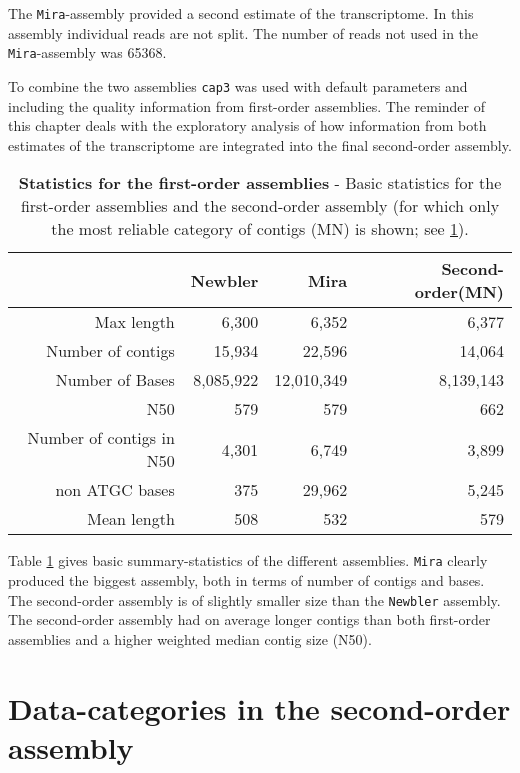The \texttt{Mira}-assembly provided a second estimate of the
transcriptome. In this assembly individual reads are not split. The
number of reads not used in the \texttt{Mira}-assembly was 65368.

To combine the two assemblies \texttt{cap3} was used with default
parameters and including the quality information from first-order
assemblies. The reminder of this chapter deals with the exploratory
analysis of how information from both estimates of the transcriptome
are integrated into the final second-order assembly.

\begin{table}[ht]
\begin{center}
\begin{tabular}{rrrr}
  \hline
 & Newbler & Mira & Second-order(MN) \\ 
  \hline
Max length & 6,300 & 6,352 & 6,377 \\ 
  Number of contigs & 15,934 & 22,596 & 14,064 \\ 
  Number of Bases & 8,085,922 & 12,010,349 & 8,139,143 \\ 
  N50 & 579 & 579 & 662 \\ 
  Number of contigs in N50 & 4,301 & 6,749 & 3,899 \\ 
  non ATGC bases & 375 & 29,962 & 5,245 \\ 
  Mean length & 508 & 532 & 579 \\ 
   \hline
\end{tabular}
\caption[Statistics for the first-order assemblies]{\textbf{Statistics
    for the first-order assemblies} - Basic statistics for the
  first-order assemblies and the second-order assembly (for which only
  the most reliable category of contigs (MN) is shown; see
  \ref{sec:data-categ-second}).}
\label{tab:pc}
\end{center}
\end{table}


Table \ref{tab:pc} gives basic summary-statistics of the different
assemblies. \texttt{Mira} clearly produced the biggest assembly, both
in terms of number of contigs and bases. The second-order assembly is
of slightly smaller size than the \texttt{Newbler} assembly. The
second-order assembly had on average longer contigs than both
first-order assemblies and a higher weighted median contig size (N50).

\section{Data-categories in the second-order assembly}
\label{sec:data-categ-second}

